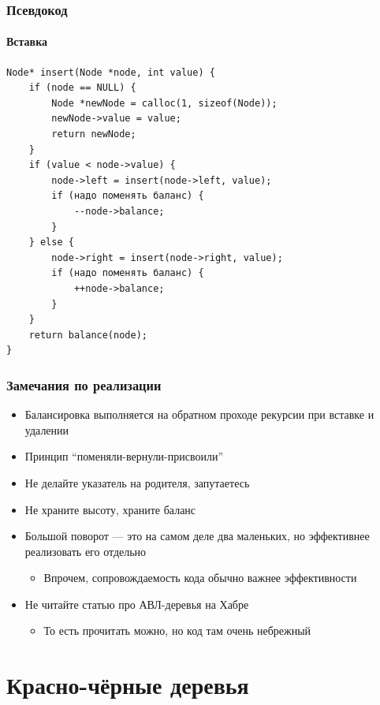 \documentclass{../../slides-style}
\begin{document}
    \begin{frame}[fragile]
        \frametitle{Псевдокод}
        \framesubtitle{Вставка}
        \begin{footnotesize}
            \begin{verbatim}
Node* insert(Node *node, int value) {
    if (node == NULL) {
        Node *newNode = calloc(1, sizeof(Node));
        newNode->value = value;
        return newNode;
    }
    if (value < node->value) {
        node->left = insert(node->left, value);
        if (надо поменять баланс) {
            --node->balance;
        }
    } else {
        node->right = insert(node->right, value);
        if (надо поменять баланс) {
            ++node->balance;
        }
    }
    return balance(node);
}
            \end{verbatim}
        \end{footnotesize}
    \end{frame}

    \begin{frame}
        \frametitle{Замечания по реализации}
        \begin{itemize}
            \item Балансировка выполняется на обратном проходе рекурсии при вставке и удалении
            \item Принцип ``поменяли-вернули-присвоили''
            \item Не делайте указатель на родителя, запутаетесь
            \item Не храните высоту, храните баланс
            \item Большой поворот --- это на самом деле два маленьких, но эффективнее реализовать его отдельно
            \begin{itemize}
                \item Впрочем, сопровождаемость кода обычно важнее эффективности
            \end{itemize}
            \item Не читайте статью про АВЛ-деревья на Хабре
            \begin{itemize}
                \item То есть прочитать можно, но код там очень небрежный
            \end{itemize}
        \end{itemize}
    \end{frame}

    \section{Красно-чёрные деревья}
\end{document}
